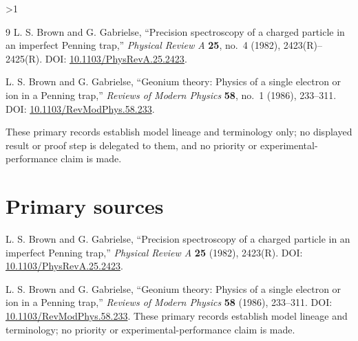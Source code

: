 \documentclass[10pt]{article}
\providecommand{\CRevisionRound}{2}
\begin{document}
\ifnum\CRevisionRound>1
\renewcommand{\refname}{Primary sources}
\begin{thebibliography}{9}
L. S. Brown and G. Gabrielse, ``Precision spectroscopy of a charged particle
in an imperfect Penning trap,'' \emph{Physical Review A} \textbf{25}, no.~4
(1982), 2423(R)--2425(R). DOI:
\href{https://doi.org/10.1103/PhysRevA.25.2423}{10.1103/PhysRevA.25.2423}.

L. S. Brown and G. Gabrielse, ``Geonium theory: Physics of a single electron
or ion in a Penning trap,'' \emph{Reviews of Modern Physics} \textbf{58}, no.~1
(1986), 233--311. DOI:
\href{https://doi.org/10.1103/RevModPhys.58.233}{10.1103/RevModPhys.58.233}.

These primary records establish model lineage and terminology only; no
displayed result or proof step is delegated to them, and no priority or
experimental-performance claim is made.
\end{thebibliography}
\else
\section*{Primary sources}
L. S. Brown and G. Gabrielse, ``Precision spectroscopy of a charged particle
in an imperfect Penning trap,'' \emph{Physical Review A} \textbf{25} (1982),
2423(R). DOI:
\href{https://doi.org/10.1103/PhysRevA.25.2423}{10.1103/PhysRevA.25.2423}.

L. S. Brown and G. Gabrielse, ``Geonium theory: Physics of a single electron
or ion in a Penning trap,'' \emph{Reviews of Modern Physics} \textbf{58}
(1986), 233--311. DOI:
\href{https://doi.org/10.1103/RevModPhys.58.233}{10.1103/RevModPhys.58.233}.
These primary records establish model lineage and terminology; no priority or
experimental-performance claim is made.
\fi
\end{document}
